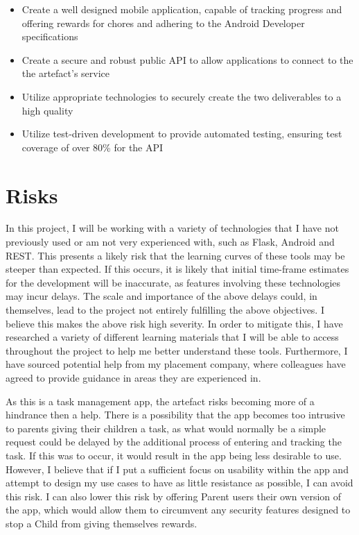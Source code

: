 \begin{itemize}
	\item Create a well designed mobile application, capable of tracking progress and offering rewards for chores and adhering to the Android Developer specifications
	\item Create a secure and robust public API to allow applications to connect to the the artefact's service
	\item Utilize appropriate technologies to securely create the two deliverables to a high quality
	\item Utilize test-driven development to provide automated testing, ensuring test coverage of over 80\% for the API
\end{itemize}

\section{Risks}
In this project, I will be working with a variety of technologies that I have not previously used or am not very experienced with, such as Flask, Android and REST. 
This presents a likely risk that the learning curves of these tools may be steeper than expected.
If this occurs, it is likely that initial time-frame estimates for the development will be inaccurate, as features involving these technologies may incur delays.
The scale and importance of the above delays could, in themselves, lead to the project not entirely fulfilling the above objectives. I believe this makes the above risk high severity.
In order to mitigate this, I have researched a variety of different learning materials that I will be able to access throughout the project to help me better understand these tools.
Furthermore, I have sourced potential help from my placement company, where colleagues have agreed to provide guidance in areas they are experienced in.

As this is a task management app, the artefact risks becoming more of a hindrance then a help.
There is a possibility that the app becomes too intrusive to parents giving their children a task, as what would normally be a simple request could be delayed by the additional process of entering and tracking the task.
If this was to occur, it would result in the app being less desirable to use.
However, I believe that if I put a sufficient focus on usability within the app and attempt to design my use cases to have as little resistance as possible, I can avoid this risk.
I can also lower this risk by offering Parent users their own version of the app, which would allow them to circumvent any security features designed to stop a Child from giving themselves rewards. 

